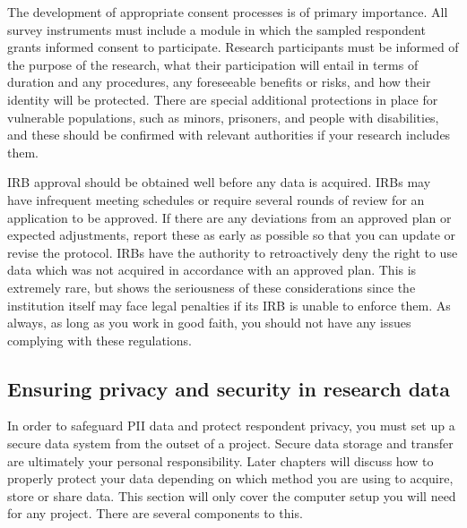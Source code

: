 {The development of appropriate consent processes is of primary importance.
All survey instruments must include a module in which the sampled respondent grants informed consent to participate.
Research participants must be informed of the purpose of the research,
what their participation will entail in terms of duration and any procedures,
any foreseeable benefits or risks,
and how their identity will be protected.
There are special additional protections in place for vulnerable populations,
such as minors, prisoners, and people with disabilities,
and these should be confirmed with relevant authorities if your research includes them.

IRB approval should be obtained well before any data is acquired.
IRBs may have infrequent meeting schedules
or require several rounds of review for an application to be approved.
If there are any deviations from an approved plan or expected adjustments,
report these as early as possible so that you can update or revise the protocol.
IRBs have the authority to retroactively deny
the right to use data which was not acquired in accordance with an approved plan.
This is extremely rare, but shows the seriousness of these considerations
since the institution itself may face legal penalties if its IRB
is unable to enforce them. As always, as long as you work in good faith,
you should not have any issues complying with these regulations.

\subsection{Ensuring privacy and security in research data}

In order to safeguard PII data and protect respondent privacy,
you must set up a secure data system from the outset of a project.
Secure data storage and transfer are ultimately your personal responsibility.
Later chapters will discuss how to properly protect your data depending on
which method you are using to acquire, store or share data.
This section will only cover the computer setup you will need for any project.
There are several components to this.

}

